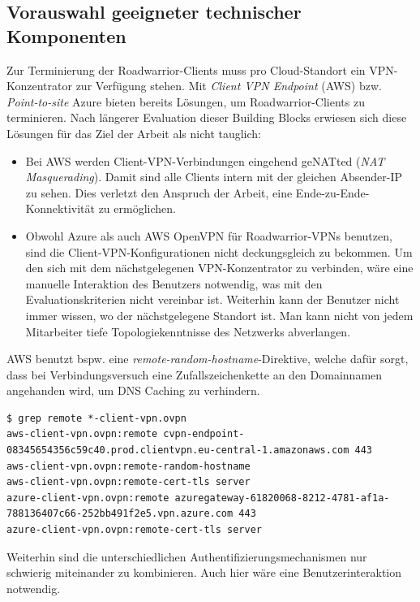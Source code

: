 \subsection{Vorauswahl geeigneter technischer Komponenten}
Zur Terminierung der Roadwarrior-Clients muss pro Cloud-Standort ein VPN-Konzentrator zur Verfügung stehen. Mit \textit{Client VPN Endpoint} (AWS) bzw. \textit{Point-to-site} Azure bieten bereits Lösungen, um Roadwarrior-Clients zu terminieren. Nach längerer Evaluation dieser Building Blocks erwiesen sich diese Lösungen für das Ziel der Arbeit als nicht tauglich:
\begin{itemize}
\item Bei AWS werden Client-VPN-Verbindungen eingehend geNATted (\textit{NAT Masquerading}). Damit sind alle Clients intern mit der gleichen Absender-IP zu sehen. Dies verletzt den Anspruch der Arbeit, eine Ende-zu-Ende-Konnektivität zu ermöglichen.
\item Obwohl Azure als auch AWS OpenVPN für Roadwarrior-VPNs benutzen, sind die Client-VPN-Konfigurationen nicht \glqq deckungsgleich\grqq{} zu bekommen. Um den sich mit dem nächstgelegenen VPN-Konzentrator zu verbinden, wäre eine manuelle Interaktion des Benutzers notwendig, was mit den Evaluationskriterien nicht vereinbar ist. Weiterhin kann der Benutzer nicht immer wissen, wo der nächstgelegene Standort ist. Man kann nicht von jedem Mitarbeiter tiefe Topologiekenntnisse des Netzwerks abverlangen.
\end{itemize}

AWS benutzt bspw. eine \textit{remote-random-hostname}-Direktive, welche dafür sorgt, dass bei Verbindungsversuch eine Zufallszeichenkette an den Domainnamen angehanden wird, um DNS Caching zu verhindern.
\begin{lstlisting}[label=ovpn_configs_aws_azure,caption=Auszüge aus den OpenVPN-Client-Konfigurationen für AWS und Azure]
$ grep remote *-client-vpn.ovpn
aws-client-vpn.ovpn:remote cvpn-endpoint-08345654356c59c40.prod.clientvpn.eu-central-1.amazonaws.com 443
aws-client-vpn.ovpn:remote-random-hostname
aws-client-vpn.ovpn:remote-cert-tls server
azure-client-vpn.ovpn:remote azuregateway-61820068-8212-4781-af1a-788136407c66-252bb491f2e5.vpn.azure.com 443
azure-client-vpn.ovpn:remote-cert-tls server
\end{lstlisting}

Weiterhin sind die unterschiedlichen Authentifizierungsmechanismen nur schwierig miteinander zu kombinieren. Auch hier wäre eine Benutzerinteraktion notwendig.


